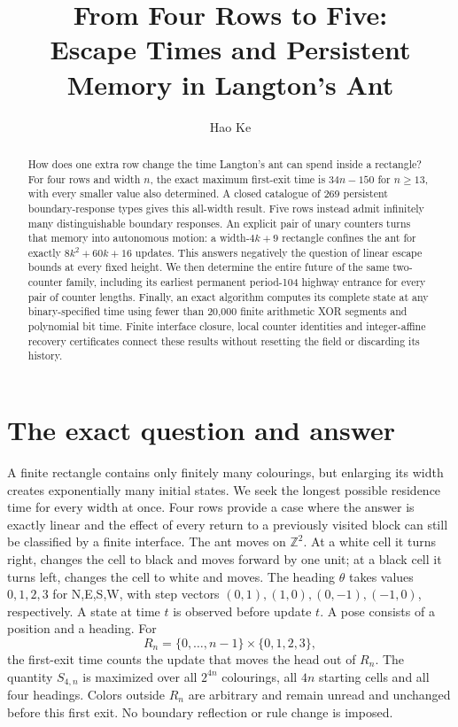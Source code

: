 \documentclass[11pt]{article}
\title{From Four Rows to Five:\\Escape Times and Persistent Memory in Langton's Ant}
\author{Hao Ke}
\date{}
\theoremstyle{definition}\newtheorem{definition}[theorem]{Definition}
\newcommand{\ZZ}{\mathbb Z}
\begin{document}
\maketitle
\begin{abstract}
How does one extra row change the time Langton's ant can spend inside a
rectangle? For four rows and width $n$, the exact maximum first-exit time is
$34n-150$ for $n\ge13$, with every smaller value also determined. A closed
catalogue of 269 persistent boundary-response types gives this all-width result.
Five rows instead admit infinitely many distinguishable boundary responses.
An explicit pair of unary counters turns that memory into autonomous motion:
a width-$4k+9$ rectangle confines the ant for exactly $8k^2+60k+16$ updates.
This answers negatively the question of linear escape bounds at every fixed
height. We then determine the entire future of the same two-counter family,
including its earliest permanent period-104 highway entrance for every pair
of counter lengths. Finally, an exact algorithm computes its complete state
at any binary-specified time using fewer than 20,000 finite arithmetic XOR
segments and polynomial bit time. Finite interface closure, local counter
identities and integer-affine recovery certificates connect these results
without resetting the field or discarding its history.
\end{abstract}

\section{The exact question and answer}
A finite rectangle contains only finitely many colourings, but enlarging its
width creates exponentially many initial states. We seek the longest possible
residence time for every width at once. Four rows provide a case where the
answer is exactly linear and the effect of every return to a previously
visited block can still be classified by a finite interface.
The ant moves on $\ZZ^2$. At a white cell it turns right, changes the cell to
black and moves forward by one unit; at a black cell it turns left, changes the
cell to white and moves. The heading $\theta$ takes values $0,1,2,3$ for N,E,S,W, with step vectors
$(0,1),(1,0),(0,-1),(-1,0)$, respectively. A state at time $t$ is
observed before update $t$. A pose consists of a position and a heading. For
\[
 R_n=\{0,\ldots,n-1\}\times\{0,1,2,3\},
\]
the first-exit time counts the update that moves the head out of $R_n$.
The quantity $S_{4,n}$ is maximized over all $2^{4n}$ colourings, all $4n$ starting
cells and all four headings. Colors outside $R_n$ are arbitrary and remain
unread and unchanged before this first exit. No boundary reflection or rule
change is imposed.
\end{document}
